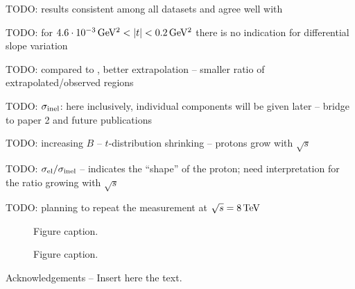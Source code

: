 \documentclass[doublecol]{../macros/epl2}
\def\un#1{\,{\rm #1}}
\begin{document}
TODO: results consistent among all datasets and agree well with \cite{epl96}

TODO: for $4.6\cdot10^{-3}\un{GeV^2} < |t| < 0.2\un{GeV^2}$ there is no indication for differential slope variation

TODO: compared to \cite{epl96}, better extrapolation -- smaller ratio of extrapolated/observed regions

TODO: $\sigma_{\rm inel}$: here inclusively, individual components will be given later -- bridge to paper 2 and future publications

TODO: increasing $B$ -- $t$-distribution shrinking -- protons grow with $\sqrt s$

TODO: $\sigma_{\rm el} / \sigma_{\rm inel}$ -- indicates the ``shape'' of the proton; need interpretation for the ratio growing with $\sqrt s$

TODO: planning to repeat the measurement at $\sqrt s = 8\un{TeV}$



\begin{figure}
\caption{Figure caption.}
\label{fig.1}
\end{figure}

\begin{figure}
\caption{Figure caption.}
\label{fig.1}
\end{figure}




\acknowledgments
Acknowledgements -- Insert here the text.
\end{document}
